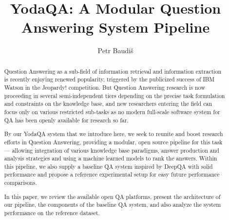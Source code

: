 \documentclass{poster15}
\begin{document}

%
\title{YodaQA: A Modular Question Answering System Pipeline}
%

%
\author{Petr Baudiš}
%


\maketitle


\begin{abstract}
	Question Answering as a sub-field of information retrieval
	and information extraction is recently enjoying renewed
	popularity, triggered by the publicized success of IBM Watson in
	the Jeopardy! competition.  But Question Answering research is
	now proceeding in several semi-independent tiers depending on the
	precise task formulation and constraints on the knowledge base,
	and new researchers entering the field can focus only on
	various restricted sub-tasks as no modern full-scale software
	system for QA has been openly available for research so far.

	By our YodaQA system that we introduce here,
	we seek to reunite and boost research efforts
	in Question Answering, providing a modular, open source
	pipeline for this task --- allowing integration of
	various knowledge base paradigms,
	answer production and analysis strategies and using a machine
	learned models to rank the answers.  Within this pipeline,
	we also supply a baseline QA system inspired by DeepQA
	with solid performance
	and propose a reference experimental setup
	for easy future performance comparisons.

	In this paper, we review the available open QA platforms,
	present the architecture of our pipeline,
	the components of the baseline QA system, and also analyze
	the system performance on the reference dataset.
\end{abstract}
\end{document}
